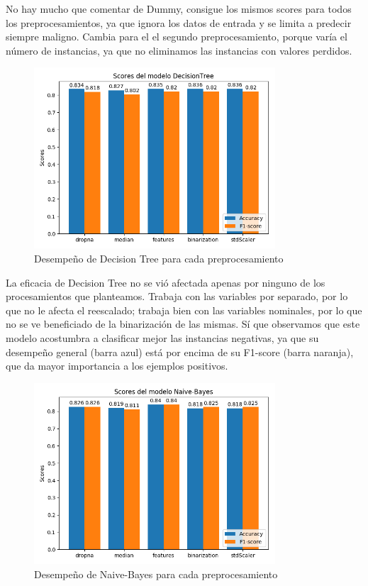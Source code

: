 \documentclass[oneside]{book}
\begin{document}
No hay mucho que comentar de Dummy, consigue los mismos scores para
todos los preprocesamientos, ya que ignora los datos de entrada y se
limita a predecir siempre maligno. Cambia para el el segundo
preprocesamiento, porque varía el número de instancias, ya que no
eliminamos las instancias con valores perdidos.

\begin{figure}[H]
  \centering
  \label{fig:dt}
  \caption{Desempeño de Decision Tree para cada preprocesamiento}
  \includegraphics[width=90mm]{figures/visualizacion/decisionTree}
\end{figure}

La eficacia de Decision Tree no se vió afectada apenas por ninguno de
los procesamientos que planteamos. Trabaja con las variables por
separado, por lo que no le afecta el reescalado; trabaja bien con las
variables nominales, por lo que no se ve beneficiado de la
binarización de las mismas. Sí que observamos que este modelo
acostumbra a clasificar mejor las instancias negativas, ya que su
desempeño general (barra azul) está por encima de su F1-score (barra
naranja), que da mayor importancia a los ejemplos positivos.

\begin{figure}[H]
  \centering
  \label{fig:nb}
  \caption{Desempeño de Naive-Bayes para cada preprocesamiento}
  \includegraphics[width=90mm]{figures/visualizacion/gaussianNB}
\end{figure}
\end{document}
